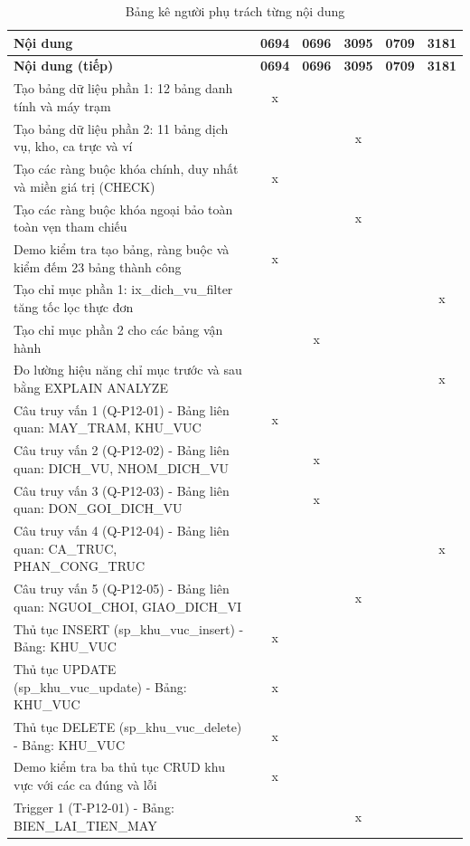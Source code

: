 \begin{longtable}{@{}>{\raggedright\arraybackslash}p{82mm}ccccc@{}}\caption{Bảng kê người phụ trách từng nội dung}\\\toprule
\textbf{Nội dung} &\textbf{0694}&\textbf{0696}&\textbf{3095}&\textbf{0709}&\textbf{3181}\\\midrule\endfirsthead
\toprule\textbf{Nội dung (tiếp)} &\textbf{0694}&\textbf{0696}&\textbf{3095}&\textbf{0709}&\textbf{3181}\\\midrule\endhead
\bottomrule\endfoot
Tạo bảng dữ liệu phần 1: 12 bảng danh tính và máy trạm & x &  &  &  & \\
Tạo bảng dữ liệu phần 2: 11 bảng dịch vụ, kho, ca trực và ví &  &  & x &  & \\
Tạo các ràng buộc khóa chính, duy nhất và miền giá trị (CHECK) & x &  &  &  & \\
Tạo các ràng buộc khóa ngoại bảo toàn toàn vẹn tham chiếu &  &  & x &  & \\
Demo kiểm tra tạo bảng, ràng buộc và kiểm đếm 23 bảng thành công & x &  &  &  & \\
Tạo chỉ mục phần 1: ix\_dich\_vu\_filter tăng tốc lọc thực đơn &  &  &  &  & x\\
Tạo chỉ mục phần 2 cho các bảng vận hành &  & x &  &  & \\
Đo lường hiệu năng chỉ mục trước và sau bằng EXPLAIN ANALYZE &  &  &  &  & x\\
Câu truy vấn 1 (Q-P12-01) - Bảng liên quan: MAY\_TRAM, KHU\_VUC & x &  &  &  & \\
Câu truy vấn 2 (Q-P12-02) - Bảng liên quan: DICH\_VU, NHOM\_DICH\_VU &  & x &  &  & \\
Câu truy vấn 3 (Q-P12-03) - Bảng liên quan: DON\_GOI\_DICH\_VU &  & x &  &  & \\
Câu truy vấn 4 (Q-P12-04) - Bảng liên quan: CA\_TRUC, PHAN\_CONG\_TRUC &  &  &  &  & x\\
Câu truy vấn 5 (Q-P12-05) - Bảng liên quan: NGUOI\_CHOI, GIAO\_DICH\_VI &  &  & x &  & \\
Thủ tục INSERT (sp\_khu\_vuc\_insert) - Bảng: KHU\_VUC & x &  &  &  & \\
Thủ tục UPDATE (sp\_khu\_vuc\_update) - Bảng: KHU\_VUC & x &  &  &  & \\
Thủ tục DELETE (sp\_khu\_vuc\_delete) - Bảng: KHU\_VUC & x &  &  &  & \\
Demo kiểm tra ba thủ tục CRUD khu vực với các ca đúng và lỗi & x &  &  &  & \\
Trigger 1 (T-P12-01) - Bảng: BIEN\_LAI\_TIEN\_MAY &  &  & x &  & \\

\end{longtable}
